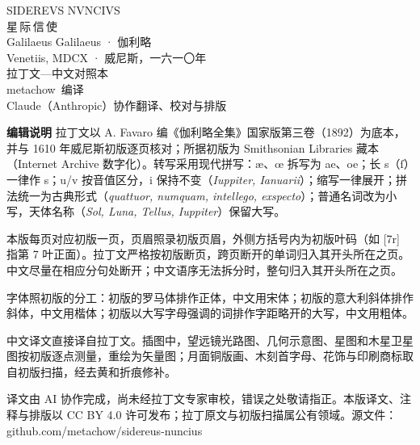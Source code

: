 \thispagestyle{empty}
\begin{center}
\vspace*{26mm}
{\fontsize{26}{30}\selectfont{}SIDEREVS NVNCIVS}\\[4mm]
{\fontsize{20}{24}\selectfont 星\,际\,信\,使}\\[10mm]
{\large Galilaeus Galilaeus · 伽利略}\\[2mm]
{\small Venetiis, MDCX · 威尼斯，一六一〇年}\\[20mm]
{\color{edgray}\small 拉丁文—中文对照本}\\[6mm]
{\small metachow\ 编译}\\[1mm]
{\color{edgray}\footnotesize Claude（Anthropic）协作翻译、校对与排版}
\end{center}

\vfill
\noindent\begin{minipage}{\textwidth}
\small\color{edgray}\setlength{\parindent}{2em}\linespread{1.25}\selectfont\sloppy
\textbf{编辑说明}\quad
拉丁文以 A. Favaro 编《伽利略全集》国家版第三卷（1892）为底本，并与 1610 年威尼斯初版逐页核对；所据初版为 Smithsonian Libraries 藏本（Internet Archive 数字化）。转写采用现代拼写：æ、œ 拆写为 ae、oe；长 s（ſ）一律作 s；u/v 按音值区分，i 保持不变（\textit{Iuppiter, Ianuarii}）；缩写一律展开；拼法统一为古典形式（\textit{quattuor, numquam, intellego, exspecto}）；普通名词改为小写，天体名称（\textit{Sol, Luna, Tellus, Iuppiter}）保留大写。

本版每页对应初版一页，页眉照录初版页眉，外侧方括号内为初版叶码（如 [7r] 指第 7 叶正面）。拉丁文严格按初版断页，跨页断开的单词归入其开头所在之页。中文尽量在相应分句处断开；中文语序无法拆分时，整句归入其开头所在之页。

字体照初版的分工：初版的罗马体排作正体，中文用宋体；初版的意大利斜体排作斜体，中文用楷体；初版以大写字母强调的词排作字距略开的大写，中文用粗体。

中文译文直接译自拉丁文。插图中，望远镜光路图、几何示意图、星图和木星卫星图按初版逐点测量，重绘为矢量图；月面铜版画、木刻首字母、花饰与印刷商标取自初版扫描，经去黄和折痕修补。

译文由 AI 协作完成，尚未经拉丁文专家审校，错误之处敬请指正。本版译文、注释与排版以 CC BY 4.0 许可发布；拉丁原文与初版扫描属公有领域。源文件：github.com/metachow/sidereus-nuncius
\end{minipage}
\cleardoublepage
